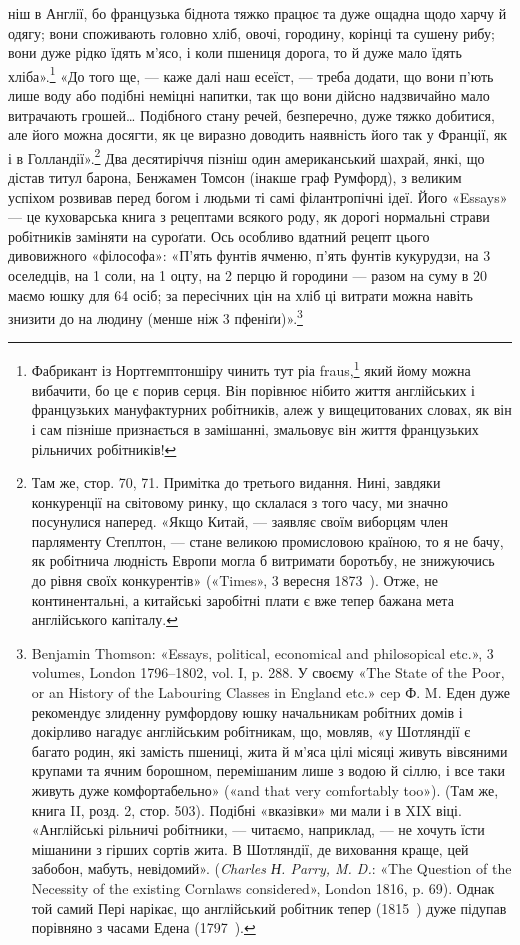 \parcont{}  %
ніш в Англії, бо французька біднота тяжко працює та дуже
ощадна щодо харчу й одягу; вони споживають головно хліб,
овочі, городину, корінці та сушену рибу; вони дуже рідко їдять
м’ясо, і коли пшениця дорога, то й дуже мало їдять хліба».\footnote{
Фабрикант із Нортгемптоншіру чинить тут ріа fraus,\footnote*{
— благочестивий обман. \emph{Ред.}
} який йому
можна вибачити, бо це є порив серця. Він порівнює нібито життя англійських
і французьких мануфактурних робітників, алеж у вищецитованих
словах, як він і сам пізніше признається в замішанні, змальовує він
життя французьких рільничих робітників!
}
«До того ще, — каже далі наш есеїст, — треба додати, що вони
п’ють лише воду або подібні неміцні напитки, так що вони дійсно
надзвичайно мало витрачають грошей\dots{} Подібного стану речей,
безперечно, дуже тяжко добитися, але його можна досягти, як
це виразно доводить наявність його так у Франції, як і в Голландії».\footnote{
Там же, стор. 70, 71. Примітка до третього видання. Нині, завдяки
конкуренції на світовому ринку, що склалася з того часу, ми значно
посунулися наперед. «Якщо Китай, — заявляє своїм виборцям член парляменту
Степлтон, — стане великою промисловою країною, то я не бачу,
як робітнича людність Европи могла б витримати боротьбу, не знижуючись
до рівня своїх конкурентів» («Times», 3 вересня 1873~). Отже,
не континентальні, а китайські заробітні плати є вже тепер бажана
мета англійського капіталу.
} Два десятиріччя пізніш один американський шахрай,
янкі, що дістав титул барона, Бенжамен Томсон (інакше граф
Румфорд), з великим успіхом розвивав перед богом і людьми ті
самі філантропічні ідеї. Його «Essays» — це куховарська книга
з рецептами всякого роду, як дорогі нормальні страви робітників
заміняти на суроґати. Ось особливо вдатний рецепт цього
дивовижного «філософа»: «П’ять фунтів ячменю, п’ять фунтів
кукурудзи, на 3 оселедців, на 1 соли, на 1 оцту,
на 2 перцю й городини — разом на суму в 20
маємо юшку для 64 осіб; за пересічних цін на хліб ці витрати
можна навіть знизити до  на людину (менше ніж 3 пфеніґи)».\footnote{
Benjamin Thomson: «Essays, political, economical and philosopical
etc.», 3 volumes, London 1796--1802, vol. I, p. 288. У своєму «The
State of the Poor, or an History of the Labouring Classes in England etc.»
cep Ф. M. Еден дуже рекомендує злиденну румфордову юшку начальникам
робітних домів і докірливо нагадує англійським робітникам,
що, мовляв, «у Шотляндії є багато родин, які замість пшениці, жита й
м’яса цілі місяці живуть вівсяними крупами та ячним борошном, перемішаним
лише з водою й сіллю, і все таки живуть дуже комфортабельно»
(«and that very comfortably too»). (Там же, книга II, розд. 2, стор. 503).
Подібні «вказівки» ми мали і в XIX віці. «Англійські рільничі робітники,
— читаємо, наприклад, — не хочуть їсти мішанини з гірших сортів
жита. В Шотляндії, де виховання краще, цей забобон, мабуть, невідомий».
(\emph{Charles Н. Parry, M. D.}: «The Question of the Necessity of the
existing Cornlaws considered», London 1816, p. 69). Однак той самий
Пері нарікає, що англійський робітник тепер (1815~) дуже підупав
порівняно з часами Едена (1797~).
}
